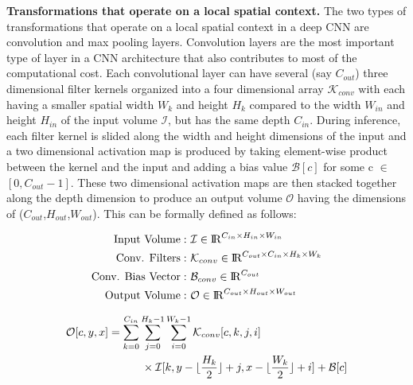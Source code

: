 \vspace{2mm}
\noindent \textbf{Transformations that operate on a local spatial context.} The two types of transformations that operate on a local spatial context in a deep CNN are convolution and max pooling layers. Convolution layers are the most important type of layer in a CNN architecture that also contributes to most of the computational cost. Each convolutional layer can have several (say $C_{out}$) three dimensional filter kernels organized into a four dimensional array $\mathcal{K}_{conv}$ with each having a smaller spatial width $W_k$ and height $H_k$ compared to the width $W_{in}$ and height $H_{in}$ of the input volume $\mathcal{I}$, but has the same depth $C_{in}$. During inference, each filter kernel is slided along the width and height dimensions of the input and a two dimensional activation map is produced by taking element-wise product between the kernel and the input and adding a bias value $\mathcal{B}[c]$ for some c $\in$ $[0, C_{out}-1]$. These two dimensional activation maps are then stacked together along the depth dimension to produce an output volume $\mathcal{O}$ having the dimensions of ($C_{out}$,$H_{out}$,$W_{out}$). This can be formally defined as follows:

\vspace{-2mm}
\begin{align}
\text{Input Volume}:&~ \mathcal{I} \in \mathcal{\rm I\!R}^{C_{in} \times H_{in} \times W_{in}}\\
\text{Conv. Filters}:&~ \mathcal{K}_{conv} \in \mathcal{\rm I\!R}^{C_{out} \times C_{in} \times H_{k} \times W_{k}}\\
\text{Conv. Bias Vector}:&~ \mathcal{B}_{conv} \in \mathcal{\rm I\!R}^{C_{out}}\\
\text{Output Volume}:&~ \mathcal{O} \in \mathcal{\rm I\!R}^{C_{out} \times H_{out} \times W_{out}}
\end{align}

\begin{equation}
\label{eqn:conv_operator}
\begin{split}
\mathcal{O}[c,y,x] &= \sum_{k=0}^{C_{in}} \sum_{j=0}^{H_k-1} \sum_{i=0}^{W_k-1} \mathcal{K}_{conv}[c, k, j, i] \\ & \quad \quad \quad \times \mathcal{I}[k,y-\lfloor\frac{H_k}{2}\rfloor+j,x-\lfloor\frac{W_k}{2}\rfloor+i] + \mathcal{B}[c]
\end{split}
\end{equation}

